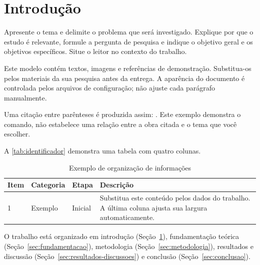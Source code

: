 \section{Introdução}
\label{sec:introducao}

Apresente o tema e delimite o problema que será investigado. Explique por que
o estudo é relevante, formule a pergunta de pesquisa e indique o objetivo
geral e os objetivos específicos. Situe o leitor no contexto do trabalho.

Este modelo contém textos, imagens e referências de demonstração. Substitua-os
pelos materiais da sua pesquisa antes da entrega. A aparência do documento é
controlada pelos arquivos de configuração; não ajuste cada parágrafo manualmente.

Uma citação entre parênteses é produzida assim: \cite{SilvaNeto2019Credibility}.
Este exemplo demonstra o comando, não estabelece uma relação entre a obra
citada e o tema que você escolher.

A \autoref{tab:identificador} demonstra uma tabela com quatro colunas.

\begin{table}[htb]
  \centering
  \caption{Exemplo de organização de informações}
  \label{tab:identificador}
  {\ABNTEXfontereduzida
  \begin{tabularx}{\linewidth}{lllX}
    \toprule
    \textbf{Item} & \textbf{Categoria} & \textbf{Etapa} & \textbf{Descrição} \\
    \midrule
    1 & Exemplo & Inicial & Substitua este conteúdo pelos dados do trabalho.
    A última coluna ajusta sua largura automaticamente. \\
    \bottomrule
  \end{tabularx}}
\end{table}

O trabalho está organizado em introdução (Seção~\ref{sec:introducao}),
fundamentação teórica (Seção~\ref{sec:fundamentacao}), metodologia
(Seção~\ref{sec:metodologia}), resultados e discussão
(Seção~\ref{sec:resultados-discussoes}) e conclusão
(Seção~\ref{sec:conclusao}).
